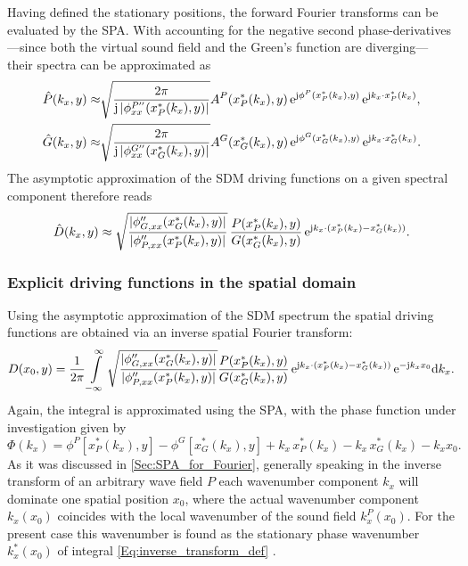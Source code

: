 Having defined the stationary positions, the forward Fourier transforms can be evaluated by the SPA. 
With accounting for the negative second phase-derivatives---since both the virtual sound field and the Green's function are diverging--- their spectra can be approximated as \cite[Ch. 5]{Tracy2014}
\begin{align}
\hat{P}(k_x,y) \approx& \sqrt{\frac{2\pi}{\mathrm{j} \, |\phi^{P''}_{xx}(x^*_P(k_x),y)|}} A^P(x^*_P(k_x),y) \, \mathrm{e}^{\mathrm{j} \phi^P(x^*_P(k_x),y)} \, \mathrm{e}^{\mathrm{j} k_x \cdot x^*_P(k_x)},\\
\hat{G}(k_x,y) \approx& \sqrt{\frac{2\pi}{\mathrm{j} \, |\phi^{G''}_{xx}(x^*_G(k_x),y)|}} A^G(x^*_G(k_x),y) \, \mathrm{e}^{\mathrm{j} \phi^G(x^*_G(k_x),y)} \, \mathrm{e}^{\mathrm{j} k_x \cdot x^*_G(k_x)}.
\end{align}
The asymptotic approximation of the SDM driving functions on a given spectral component therefore reads
\begin{equation}
\label{eq:hfapproxspectra}
\hat{D}(k_x,y)
\approx  
\sqrt{\frac{|\phi_{G,xx}''(x^*_G(k_x),y)|}{|\phi_{P,xx}''(x^*_P(k_x),y)|}}
\, \frac{P(x^*_P(k_x),y)}{G(x^*_G(k_x),y)}
\, \mathrm{e}^{\mathrm{j} k_x \cdot \left( x^*_P(k_x) - x^*_G(k_x)\right)}.
\end{equation}

\subsubsection{Explicit driving functions in the spatial domain}

Using the asymptotic approximation of the SDM spectrum the spatial driving functions are obtained via an inverse spatial Fourier transform:
%
\begin{equation}
\label{Eq:inverse_transform_def}
D(x_0,y)
=  \frac{1}{2\pi} \int\limits_{-\infty}^{\infty}
\sqrt{\frac{|\phi_{G,xx}''(x^*_G(k_x),y)|}{|\phi_{P,xx}''(x^*_P(k_x),y)|}} 
\frac{P(x^*_P(k_x),y)}{G(x^*_G(k_x),y)}
\,\mathrm{e}^{\mathrm{j} k_x \cdot\left( x^*_P(k_x) - x^*_G(k_x)\right)}
\,\mathrm{e}^{-\mathrm{j} k_x x_0} \mathrm{d} k_x
.
\end{equation}
Again, the integral is approximated using the SPA, with the phase function under investigation given by
\begin{equation}
\label{Eq:inverse_transform_phase_function}
{\Phi}(k_x) = \phi^P[x^*_P(k_x),y] -  \phi^G[x^*_G(k_x),y] +  k_x \, x^*_P(k_x) - k_x\, x^*_G(k_x) -  k_x x_0.
\end{equation}
%
As it was discussed in \ref{Sec:SPA_for_Fourier}, generally speaking in the inverse transform of an arbitrary wave field $P$ each wavenumber component $k_x$ will dominate one spatial position $x_0$, where the actual wavenumber component $k_x(x_0)$ coincides with the local wavenumber of the sound field $k_x^P(x_0)$.
For the present case this wavenumber is found as the stationary phase wavenumber $k_x^*(x_0)$ of integral \eqref{Eq:inverse_transform_def} \cite{Tracy2014}.

